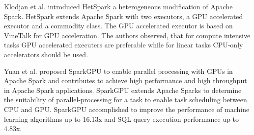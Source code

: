 Klodjan et al. \cite{Klodjan2018HetSpark} introduced HetSpark a heterogeneous modification of Apache Spark.
HetSpark extends Apache Spark with two executors, a GPU accelerated executor and a commodity class. The GPU accelerated executor is based on VineTalk\cite{Mavridis2017VineTalk} for GPU acceleration.
The authors observed, that for compute intensive tasks GPU accelerated executers are preferable while for linear tasks CPU-only accelerators should be used.


Yuan et al. \cite{Yuan2016SparkGPU} proposed SparkGPU to enable parallel processing with GPUs in Apache Spark and contributes to achieve high performance and high throughput in Apache Spark applications.
SparkGPU extends Apache Sparks to determine the suitability of parallel-processing for a task to enable task scheduling between CPU and GPU. 
SparkGPU accomplished to improve the performance of machine learning algorithms up to 16.13x and SQL query execution performance up to 4.83x.


